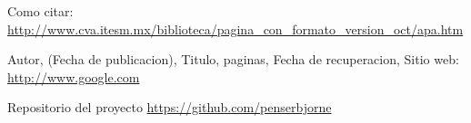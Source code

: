 \documentclass[a4paper,11pt]{article}                 %
\begin{document}
  
  \begin{thebibliography}{}                           %
      Como citar: \url{http://www.cva.itesm.mx/biblioteca/pagina_con_formato_version_oct/apa.htm} %

      Autor,
      (Fecha de publicacion),
      Titulo, paginas,
      Fecha de recuperacion,
      Sitio web: \url{http://www.google.com}

      Repositorio del proyecto \url{https://github.com/penserbjorne}
  \end{thebibliography}

\end{document}
